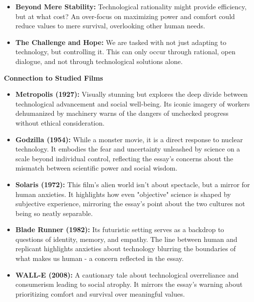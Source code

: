 \documentclass[11pt,fleqn]{book}
\begin{document}
\begin{itemize}
\item \textbf{Beyond Mere Stability:} Technological rationality might provide efficiency, but at what cost? An over-focus on maximizing power and comfort could reduce values to mere survival, overlooking other human needs.

\item \textbf{The Challenge and Hope:} We are tasked with not just adapting to technology, but controlling it. This can only occur through rational, open dialogue, and not through technological solutions alone.

\end{itemize}
\vspace{5pt}
\textbf{Connection to Studied Films}

\begin{itemize}
\item \textbf{Metropolis (1927):}  Visually stunning but explores the deep divide between technological advancement and social well-being.  Its iconic imagery of workers dehumanized by machinery warns of the dangers of unchecked progress without ethical consideration.

\item \textbf{Godzilla (1954):} While a monster movie, it is a direct response to nuclear technology. It embodies the fear and uncertainty unleashed by science on a scale beyond individual control, reflecting the essay's concerns about the mismatch between scientific power and social wisdom.

\item \textbf{Solaris (1972):} This film's alien world isn't about spectacle, but a mirror for human anxieties. It highlights how even "objective" science is shaped by subjective experience, mirroring the essay's point about the two cultures not being so neatly separable.

\item \textbf{Blade Runner (1982):}  Its futuristic setting serves as a backdrop to questions of identity, memory, and empathy. The line between human and replicant highlights anxieties about technology blurring the boundaries of what makes us human - a concern reflected in the essay. 

\item \textbf{WALL-E (2008):} A cautionary tale about technological overreliance and consumerism leading to social atrophy. It mirrors the essay's warning about prioritizing comfort and survival over meaningful values. 

\end{itemize}
\end{document}
